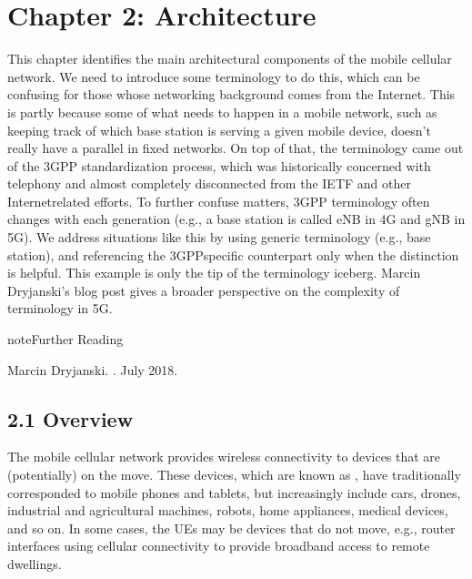 \documentclass[a4paper,11pt,english]{sphinxmanual}
\begin{document}
\chapter{Chapter 2:  Architecture}
\label{\detokenize{arch:chapter-2-architecture}}\label{\detokenize{arch::doc}}
\sphinxAtStartPar
This chapter identifies the main architectural components of the
mobile cellular network. We need to introduce some terminology to do
this, which can be confusing for those whose networking background
comes from the Internet. This is partly because some of what needs to
happen in a mobile network, such as keeping track of which base
station is serving a given mobile device, doesn’t really have a
parallel in fixed networks. On top of that, the terminology came out
of the 3GPP standardization process, which was historically concerned
with telephony and almost completely disconnected from the IETF and
other Internet\sphinxhyphen{}related efforts. To further confuse matters, 3GPP
terminology often changes with each generation (e.g., a base station
is called eNB in 4G and gNB in 5G). We address situations like this by
using generic terminology (e.g., base station), and referencing the
3GPP\sphinxhyphen{}specific counterpart only when the distinction is helpful. This
example is only the tip of the terminology iceberg. Marcin Dryjanski’s
blog post gives a broader perspective on the complexity of terminology
in 5G.

\label{\detokenize{arch:reading-terminology}}
\begin{sphinxadmonition}{note}{Further Reading}

\sphinxAtStartPar
Marcin Dryjanski. .
July 2018.
\end{sphinxadmonition}


\section{2.1 Overview}
\label{\detokenize{arch:overview}}
\sphinxAtStartPar
The mobile cellular network provides wireless connectivity to devices
that are (potentially) on the move. These devices, which are known as
, have traditionally corresponded to mobile phones
and tablets, but increasingly include cars, drones, industrial and
agricultural machines, robots, home appliances, medical devices, and
so on. In some cases, the UEs may be devices that do not move, e.g.,
router interfaces using cellular connectivity to provide broadband
access to remote dwellings.
\end{document}

